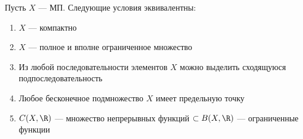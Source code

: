 \begin{theorem}
    Пусть \(X\) --- МП. Следующие условия эквивалентны:
    \begin{enumerate}
        \item \(X\) --- компактно
        \item \(X\) --- полное и вполне ограниченное множество 
        \item Из любой последовательности элементов \(X\) можно выделить сходящуюся подпоследовательность
        \item Любое бесконечное подмножество \(X\) имеет предельную точку
        \item \(C(X, \R)\) --- множество непрерывных функций \( \subset B(X, \R)\) --- ограниченные функции
    \end{enumerate}
\end{theorem}
